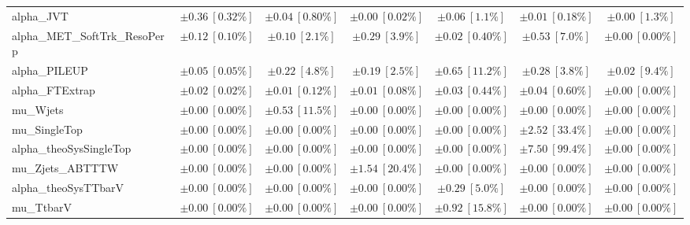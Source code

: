 \begin{sidewaystable}
\begin{center}
\begin{tabular*}{\textwidth}{@{\extracolsep{\fill}}lcccccc}
alpha\_JVT         & $\pm 0.36\ [0.32\%] $          & $\pm 0.04\ [0.80\%] $          & $\pm 0.00\ [0.02\%] $          & $\pm 0.06\ [1.1\%] $          & $\pm 0.01\ [0.18\%] $          & $\pm 0.00\ [1.3\%] $       \\
alpha\_MET\_SoftTrk\_ResoPerp         & $\pm 0.12\ [0.10\%] $          & $\pm 0.10\ [2.1\%] $          & $\pm 0.29\ [3.9\%] $          & $\pm 0.02\ [0.40\%] $          & $\pm 0.53\ [7.0\%] $          & $\pm 0.00\ [0.00\%] $       \\
alpha\_PILEUP         & $\pm 0.05\ [0.05\%] $          & $\pm 0.22\ [4.8\%] $          & $\pm 0.19\ [2.5\%] $          & $\pm 0.65\ [11.2\%] $          & $\pm 0.28\ [3.8\%] $          & $\pm 0.02\ [9.4\%] $       \\
alpha\_FTExtrap         & $\pm 0.02\ [0.02\%] $          & $\pm 0.01\ [0.12\%] $          & $\pm 0.01\ [0.08\%] $          & $\pm 0.03\ [0.44\%] $          & $\pm 0.04\ [0.60\%] $          & $\pm 0.00\ [0.00\%] $       \\
mu\_Wjets         & $\pm 0.00\ [0.00\%] $          & $\pm 0.53\ [11.5\%] $          & $\pm 0.00\ [0.00\%] $          & $\pm 0.00\ [0.00\%] $          & $\pm 0.00\ [0.00\%] $          & $\pm 0.00\ [0.00\%] $       \\
mu\_SingleTop         & $\pm 0.00\ [0.00\%] $          & $\pm 0.00\ [0.00\%] $          & $\pm 0.00\ [0.00\%] $          & $\pm 0.00\ [0.00\%] $          & $\pm 2.52\ [33.4\%] $          & $\pm 0.00\ [0.00\%] $       \\
alpha\_theoSysSingleTop         & $\pm 0.00\ [0.00\%] $          & $\pm 0.00\ [0.00\%] $          & $\pm 0.00\ [0.00\%] $          & $\pm 0.00\ [0.00\%] $          & $\pm 7.50\ [99.4\%] $          & $\pm 0.00\ [0.00\%] $       \\
mu\_Zjets\_ABTTTW         & $\pm 0.00\ [0.00\%] $          & $\pm 0.00\ [0.00\%] $          & $\pm 1.54\ [20.4\%] $          & $\pm 0.00\ [0.00\%] $          & $\pm 0.00\ [0.00\%] $          & $\pm 0.00\ [0.00\%] $       \\
alpha\_theoSysTTbarV         & $\pm 0.00\ [0.00\%] $          & $\pm 0.00\ [0.00\%] $          & $\pm 0.00\ [0.00\%] $          & $\pm 0.29\ [5.0\%] $          & $\pm 0.00\ [0.00\%] $          & $\pm 0.00\ [0.00\%] $       \\
mu\_TtbarV         & $\pm 0.00\ [0.00\%] $          & $\pm 0.00\ [0.00\%] $          & $\pm 0.00\ [0.00\%] $          & $\pm 0.92\ [15.8\%] $          & $\pm 0.00\ [0.00\%] $          & $\pm 0.00\ [0.00\%] $       \\

\end{tabular*}
\end{center}
\end{sidewaystable}

